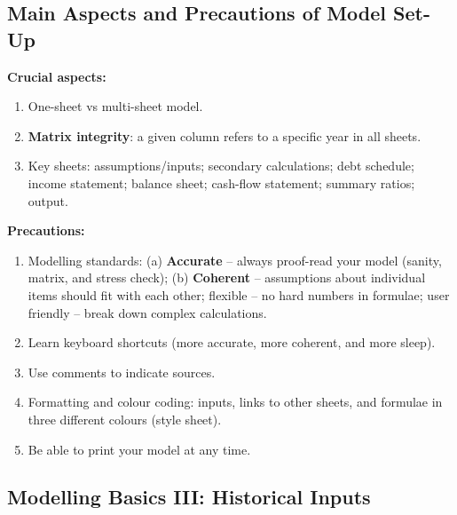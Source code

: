 \subsection[Main Aspects and Precautions of Model Set-Up]{Main Aspects and Precautions of Model Set-Up }

\textbf{Crucial aspects:}
\begin{enumerate}
  \item One-sheet vs multi-sheet model.
  \item \textbf{Matrix integrity}: a given column refers to a specific year in all sheets.
  \item Key sheets: assumptions/inputs; secondary calculations; debt schedule; income statement; balance sheet; cash-flow statement; summary ratios; output.
\end{enumerate}
\textbf{Precautions:}
\begin{enumerate}
  \item Modelling standards: (a) \textbf{Accurate} -- always proof-read your model (sanity, matrix, and stress check); (b) \textbf{Coherent} -- assumptions about individual items should fit with each other; flexible -- no hard numbers in formulae; user friendly -- break down complex calculations.
  \item Learn keyboard shortcuts (more accurate, more coherent, and more sleep).
  \item Use comments to indicate sources.
  \item Formatting and colour coding: inputs, links to other sheets, and formulae in three different colours (style sheet).
  \item Be able to print your model at any time.
\end{enumerate}

\subsection[Modelling Basics III: Historical Inputs]{Modelling Basics III: Historical Inputs }

